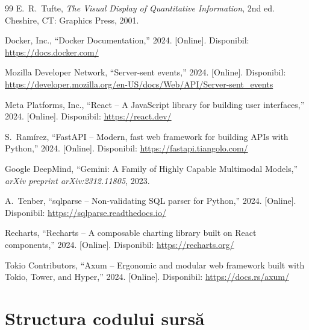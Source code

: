 \documentclass[12pt, a4paper]{report}
\begin{document}
\begin{thebibliography}{99}
E.~R.~Tufte, \textit{The Visual Display of Quantitative Information}, 2nd ed. Cheshire, CT: Graphics Press, 2001.

Docker, Inc., ``Docker Documentation,'' 2024. [Online]. Disponibil: \url{https://docs.docker.com/}

Mozilla Developer Network, ``Server-sent events,'' 2024. [Online]. Disponibil: \url{https://developer.mozilla.org/en-US/docs/Web/API/Server-sent_events}

Meta Platforms, Inc., ``React -- A JavaScript library for building user interfaces,'' 2024. [Online]. Disponibil: \url{https://react.dev/}

S.~Ram\'{i}rez, ``FastAPI -- Modern, fast web framework for building APIs with Python,'' 2024. [Online]. Disponibil: \url{https://fastapi.tiangolo.com/}

Google DeepMind, ``Gemini: A Family of Highly Capable Multimodal Models,'' \textit{arXiv preprint arXiv:2312.11805}, 2023.

A.~Tenber, ``sqlparse -- Non-validating SQL parser for Python,'' 2024. [Online]. Disponibil: \url{https://sqlparse.readthedocs.io/}

Recharts, ``Recharts -- A composable charting library built on React components,'' 2024. [Online]. Disponibil: \url{https://recharts.org/}

Tokio Contributors, ``Axum -- Ergonomic and modular web framework built with Tokio, Tower, and Hyper,'' 2024. [Online]. Disponibil: \url{https://docs.rs/axum/}

\end{thebibliography}


\appendix
\chapter{Structura codului sursă}
\end{document}

